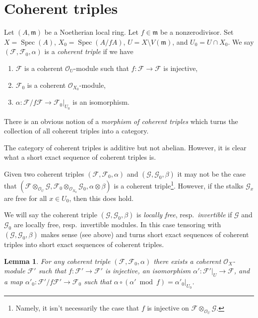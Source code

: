 \documentclass[10pt,a4paper]{amsart}
\theoremstyle{plain}
\newtheorem{lemma}[subsection]{Lemma}
\theoremstyle{definition}
\theoremstyle{remark}
\numberwithin{equation}{subsection}
\def\Spec{\mathop{\mathrm{Spec}}}
\begin{document}
\section{Coherent triples}
\label{section-coherent-triples}

\noindent
Let $(A, \mathfrak m)$ be a Noetherian local ring.
Let $f \in \mathfrak m$ be a nonzerodivisor. Set
$X = \Spec(A)$, $X_0 = \Spec(A/fA)$, $U = X \setminus V(\mathfrak m)$, and
$U_0 = U \cap X_0$.
We say $(\mathcal{F}, \mathcal{F}_0, \alpha)$ is a {\it coherent triple}
if we have
\begin{enumerate}
\item $\mathcal{F}$ is a coherent $\mathcal{O}_U$-module such that
$f : \mathcal{F} \to \mathcal{F}$ is injective,
\item $\mathcal{F}_0$ is a coherent $\mathcal{O}_{X_0}$-module,
\item $\alpha : \mathcal{F}/f\mathcal{F} \to \mathcal{F}_0|_{U_0}$
is an isomorphism.
\end{enumerate}
There is an obvious notion of a {\it morphism of coherent triples}
which turns the collection of all coherent triples into a category.

\medskip\noindent
The category of coherent triples is additive but not abelian.
However, it is clear what a short exact sequence of coherent
triples is.

\medskip\noindent
Given two coherent triples $(\mathcal{F}, \mathcal{F}_0, \alpha)$
and $(\mathcal{G}, \mathcal{G}_0, \beta)$ it may not be the case that
$(\mathcal{F} \otimes_{\mathcal{O}_U} \mathcal{G},
\mathcal{F}_0  \otimes_{\mathcal{O}_{X_0}} \mathcal{G}_0,
\alpha \otimes \beta)$ is a coherent triple\footnote{Namely, it
isn't necessarily the case that $f$
is injective on $\mathcal{F} \otimes_{\mathcal{O}_U} \mathcal{G}$.}.
However, if the stalks $\mathcal{G}_x$ are
free for all $x \in U_0$, then this does hold.

\medskip\noindent
We will say the coherent triple $(\mathcal{G}, \mathcal{G}_0, \beta)$
is {\it locally free}, resp.\ {\it invertible}
if $\mathcal{G}$ and $\mathcal{G}_0$
are locally free, resp.\ invertible modules. In this case tensoring
with $(\mathcal{G}, \mathcal{G}_0, \beta)$ makes sense (see above)
and turns short exact sequences of coherent triples into short exact
sequences of coherent triples.

\begin{lemma}
\label{lemma-prepare-chi-triple}
For any coherent triple $(\mathcal{F}, \mathcal{F}_0, \alpha)$
there exists a coherent $\mathcal{O}_X$-module $\mathcal{F}'$
such that $f : \mathcal{F}' \to \mathcal{F}'$ is injective,
an isomorphism $\alpha' : \mathcal{F}'|_U \to \mathcal{F}$, and a map
$\alpha'_0 : \mathcal{F}'/f\mathcal{F}' \to \mathcal{F}_0$
such that $\alpha \circ (\alpha' \bmod f) = \alpha'_0|_{U_0}$.
\end{lemma}
\end{document}
